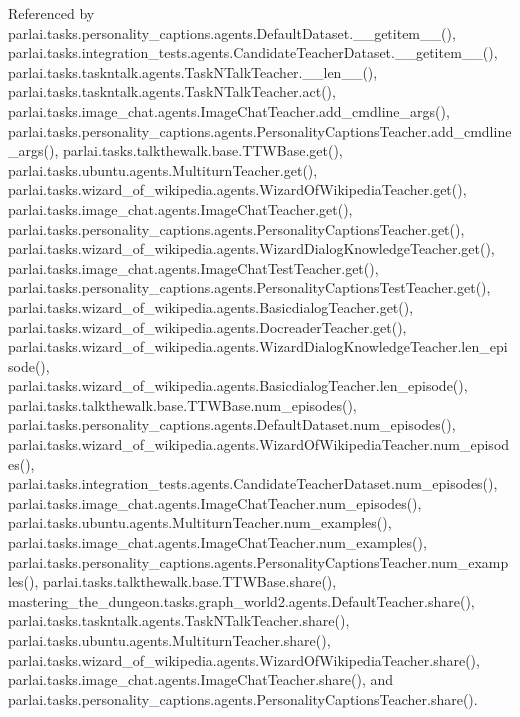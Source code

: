 Referenced by parlai.\+tasks.\+personality\+\_\+captions.\+agents.\+Default\+Dataset.\+\_\+\+\_\+getitem\+\_\+\+\_\+(), parlai.\+tasks.\+integration\+\_\+tests.\+agents.\+Candidate\+Teacher\+Dataset.\+\_\+\+\_\+getitem\+\_\+\+\_\+(), parlai.\+tasks.\+taskntalk.\+agents.\+Task\+N\+Talk\+Teacher.\+\_\+\+\_\+len\+\_\+\+\_\+(), parlai.\+tasks.\+taskntalk.\+agents.\+Task\+N\+Talk\+Teacher.\+act(), parlai.\+tasks.\+image\+\_\+chat.\+agents.\+Image\+Chat\+Teacher.\+add\+\_\+cmdline\+\_\+args(), parlai.\+tasks.\+personality\+\_\+captions.\+agents.\+Personality\+Captions\+Teacher.\+add\+\_\+cmdline\+\_\+args(), parlai.\+tasks.\+talkthewalk.\+base.\+T\+T\+W\+Base.\+get(), parlai.\+tasks.\+ubuntu.\+agents.\+Multiturn\+Teacher.\+get(), parlai.\+tasks.\+wizard\+\_\+of\+\_\+wikipedia.\+agents.\+Wizard\+Of\+Wikipedia\+Teacher.\+get(), parlai.\+tasks.\+image\+\_\+chat.\+agents.\+Image\+Chat\+Teacher.\+get(), parlai.\+tasks.\+personality\+\_\+captions.\+agents.\+Personality\+Captions\+Teacher.\+get(), parlai.\+tasks.\+wizard\+\_\+of\+\_\+wikipedia.\+agents.\+Wizard\+Dialog\+Knowledge\+Teacher.\+get(), parlai.\+tasks.\+image\+\_\+chat.\+agents.\+Image\+Chat\+Test\+Teacher.\+get(), parlai.\+tasks.\+personality\+\_\+captions.\+agents.\+Personality\+Captions\+Test\+Teacher.\+get(), parlai.\+tasks.\+wizard\+\_\+of\+\_\+wikipedia.\+agents.\+Basicdialog\+Teacher.\+get(), parlai.\+tasks.\+wizard\+\_\+of\+\_\+wikipedia.\+agents.\+Docreader\+Teacher.\+get(), parlai.\+tasks.\+wizard\+\_\+of\+\_\+wikipedia.\+agents.\+Wizard\+Dialog\+Knowledge\+Teacher.\+len\+\_\+episode(), parlai.\+tasks.\+wizard\+\_\+of\+\_\+wikipedia.\+agents.\+Basicdialog\+Teacher.\+len\+\_\+episode(), parlai.\+tasks.\+talkthewalk.\+base.\+T\+T\+W\+Base.\+num\+\_\+episodes(), parlai.\+tasks.\+personality\+\_\+captions.\+agents.\+Default\+Dataset.\+num\+\_\+episodes(), parlai.\+tasks.\+wizard\+\_\+of\+\_\+wikipedia.\+agents.\+Wizard\+Of\+Wikipedia\+Teacher.\+num\+\_\+episodes(), parlai.\+tasks.\+integration\+\_\+tests.\+agents.\+Candidate\+Teacher\+Dataset.\+num\+\_\+episodes(), parlai.\+tasks.\+image\+\_\+chat.\+agents.\+Image\+Chat\+Teacher.\+num\+\_\+episodes(), parlai.\+tasks.\+ubuntu.\+agents.\+Multiturn\+Teacher.\+num\+\_\+examples(), parlai.\+tasks.\+image\+\_\+chat.\+agents.\+Image\+Chat\+Teacher.\+num\+\_\+examples(), parlai.\+tasks.\+personality\+\_\+captions.\+agents.\+Personality\+Captions\+Teacher.\+num\+\_\+examples(), parlai.\+tasks.\+talkthewalk.\+base.\+T\+T\+W\+Base.\+share(), mastering\+\_\+the\+\_\+dungeon.\+tasks.\+graph\+\_\+world2.\+agents.\+Default\+Teacher.\+share(), parlai.\+tasks.\+taskntalk.\+agents.\+Task\+N\+Talk\+Teacher.\+share(), parlai.\+tasks.\+ubuntu.\+agents.\+Multiturn\+Teacher.\+share(), parlai.\+tasks.\+wizard\+\_\+of\+\_\+wikipedia.\+agents.\+Wizard\+Of\+Wikipedia\+Teacher.\+share(), parlai.\+tasks.\+image\+\_\+chat.\+agents.\+Image\+Chat\+Teacher.\+share(), and parlai.\+tasks.\+personality\+\_\+captions.\+agents.\+Personality\+Captions\+Teacher.\+share().

